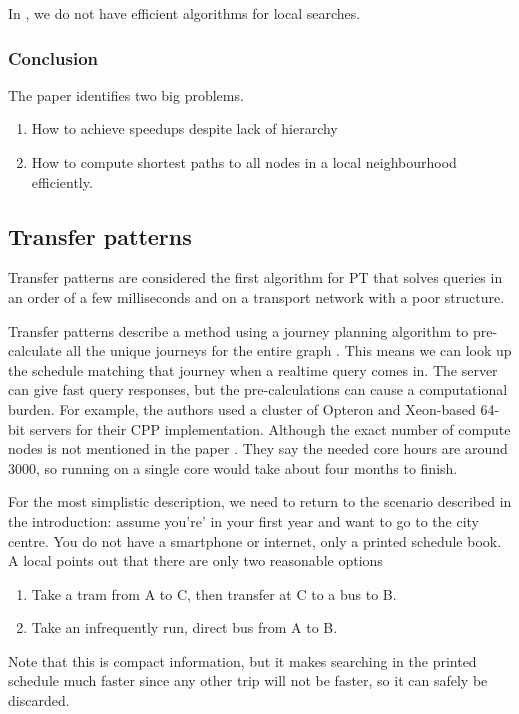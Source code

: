 In , we do not have efficient algorithms for local searches.
\subsubsection{Conclusion}
The paper identifies two big problems. 
\begin{enumerate}
    \item How to achieve speedups despite lack of hierarchy
    \item How to compute shortest paths to all nodes in a local neighbourhood efficiently.
\end{enumerate}
\subsection{Transfer patterns}
Transfer patterns are considered the first algorithm for PT that solves queries in an order of a few milliseconds and on a transport network with a poor structure. 

Transfer patterns describe a method using a journey planning algorithm to pre-calculate all the unique journeys for the entire graph \cite{bast_fast_2010}. This means we can look up the schedule matching that journey when a realtime query comes in. The server can give fast query responses, but the pre-calculations can cause a computational burden. For example, the authors used a cluster of Opteron and Xeon-based 64-bit servers for their CPP implementation. Although the exact number of compute nodes is not mentioned in the paper \cite{bast_fast_2010}. They say the needed core hours are around 3000, so running on a single core would take about four months to finish.

For the most simplistic description, we need to return to the scenario described in the introduction: assume you're' in your first year and want to go to the city centre. You do not have a smartphone or internet, only a printed schedule book. A local points out that there are only two reasonable options \begin{enumerate}
    \item Take a tram from A to C, then transfer at C to a bus to B.
    \item Take an infrequently run, direct bus from A to B.
\end{enumerate} 
Note that this is compact information, but it makes searching in the printed schedule much faster since any other trip will not be faster, so it can safely be discarded. \cite{noauthor_update_nodate}


